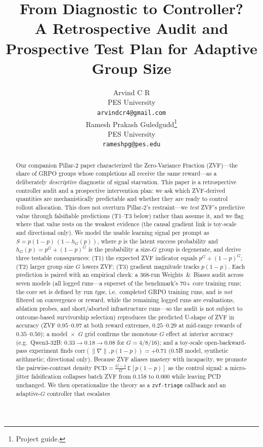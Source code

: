 \documentclass{article}
\title{From Diagnostic to Controller?\\
       A Retrospective Audit and Prospective Test Plan for Adaptive Group Size}
\author{
  Arvind C R \\
  PES University\\
  \texttt{arvindcr4@gmail.com} \\
  \And
  Ramesh Prakash Guledgudd\thanks{Project guide.} \\
  PES University\\
  \texttt{rameshpg@pes.edu} \\
}
\newcommand{\E}{\mathbb{E}}
\begin{document}
\sloppy {}  \hfuzz=2pt
\maketitle
\begin{abstract}
Our companion Pillar-2 paper characterized the Zero-Variance Fraction
(ZVF)---the share of GRPO groups whose completions all receive the same
reward---as a deliberately \emph{descriptive} diagnostic of signal starvation.
This paper is a retrospective controller audit and a prospective intervention
plan: we ask which ZVF-derived quantities are mechanistically predictable and
whether they are ready to control rollout allocation. This does not
overturn Pillar-2's restraint---we \emph{test} ZVF's predictive value through
falsifiable predictions (T1--T3 below) rather than assume it, and we flag where
that value rests on the weakest evidence (the causal gradient link is toy-scale
and directional only). We model the
usable learning signal per prompt as $S = p(1-p)\,(1 - h_G(p))$, where $p$ is
the latent success probability and $h_G(p) = p^G + (1-p)^G$ is the probability
a size-$G$ group is degenerate, and derive three testable consequences:
(T1) the expected ZVF indicator equals $p^G + (1-p)^G$; (T2) larger group
size $G$ lowers ZVF; (T3) gradient magnitude tracks $p(1-p)$. Each prediction
is paired with an empirical check: a 368-run Weights~\&~Biases audit across seven
models (all logged runs---a superset of the benchmark's 70+ core training runs; the
core set is defined by run \emph{type}, i.e.\ completed GRPO training runs, and is
\emph{not} filtered on convergence or reward, while the remaining logged runs are
evaluations, ablation probes, and short/aborted infrastructure runs---so the audit
is not subject to outcome-based survivorship selection)
reproduces the predicted U-shape of ZVF in accuracy (ZVF $0.95$--$0.97$ at both
reward extremes, $0.25$--$0.29$ at mid-range rewards of $0.35$--$0.50$); a
model~$\times$~$G$ grid confirms the monotone $G$ effect at interior accuracy
(e.g.\ Qwen3-32B: $0.33 \to 0.18 \to
0.08$ for $G = 4/8/16$); and a toy-scale open-backward-pass experiment finds
$\mathrm{corr}(\|\nabla\|, p(1-p)) = +0.71$ (0.5B model, synthetic arithmetic;
directional only). Because ZVF aliases mastery with incapacity, we promote the
pairwise-contrast density $\mathrm{PCD} = \frac{G-1}{G}\,\E[p(1-p)]$ as the
control signal: a micro-jitter falsification collapses batch ZVF from $0.158$
to $0.000$ while leaving PCD unchanged. We then operationalize the theory as a
\texttt{zvf-triage} callback and an adaptive-$G$ controller that escalates

\end{abstract}
\end{document}
